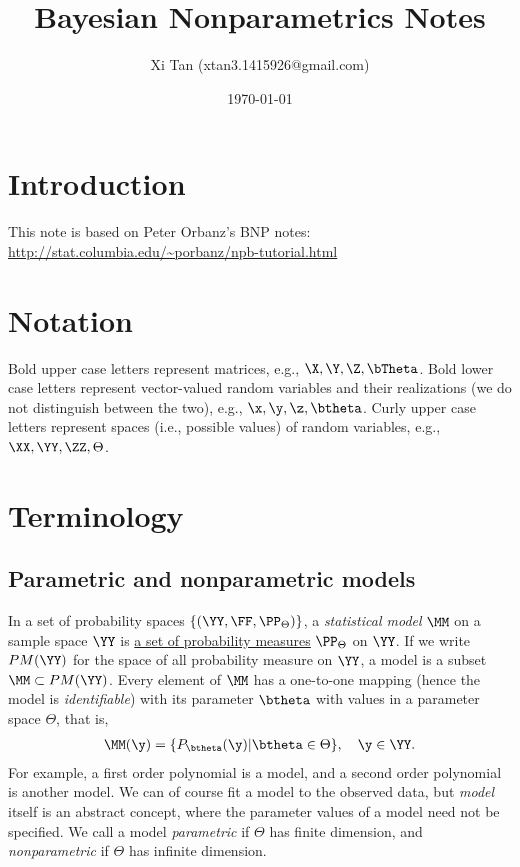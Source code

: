 \documentclass{article}
\title{Bayesian Nonparametrics Notes}
\author{Xi Tan (xtan3.1415926@gmail.com)}
\date{\today}
\begin{document}
\maketitle
\tableofcontents


\section{Introduction}
This note is based on Peter Orbanz's BNP notes:
\vspace*{5mm}
\\
\url{http://stat.columbia.edu/~porbanz/npb-tutorial.html}

\section{Notation}
Bold upper case letters represent matrices, e.g., $\X, \Y, \Z, \bTheta$. Bold lower case letters represent vector-valued random variables and their realizations (we do not distinguish between the two), e.g., $\x, \y, \z, \btheta$. Curly upper case letters represent spaces (i.e., possible values) of random variables, e.g., $\XX, \YY, \ZZ, \Theta$.

\section{Terminology}
\subsection{Parametric and nonparametric models}
In a set of probability spaces $\{(\YY, \FF, \PP_\Theta)\}$, a {\em{statistical model}} $\MM$ on a sample space $\YY$ is {\underline{a set of probability measures}} $\PP_\Theta$ on $\YY$. If we write $PM(\YY)$ for the space of all probability measure on $\YY$, a model is a subset $\MM \subset PM(\YY)$. Every element of $\MM$ has a one-to-one mapping (hence the model is {\em{identifiable}}) with its parameter $\btheta$ with values in a parameter space $\Theta$, that is,
\begin{align}
\MM(\y) = \{P_\btheta(\y) | \btheta \in \Theta\},\quad \y \in \YY.
\end{align}
For example, a first order polynomial is a model, and a second order polynomial is another model. We can of course fit a model to the observed data, but {\em{model}} itself is an abstract concept, where the parameter values of a model need not be specified. We call a model {\em{parametric}} if $\Theta$ has finite dimension, and {\em{nonparametric}} if $\Theta$ has infinite dimension.
\end{document}
